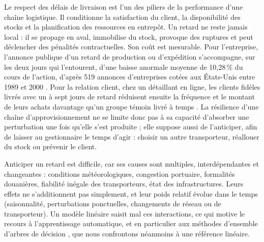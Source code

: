 \documentclass[11pt,a4paper]{article}
\theoremstyle{definition}
\begin{document}
Le respect des délais de livraison est l'un des piliers de la performance d'une chaîne logistique. Il conditionne la satisfaction du client, la disponibilité des stocks et la planification des ressources en entrepôt. Un retard ne reste jamais local : il se propage en aval, immobilise du stock, provoque des ruptures et peut déclencher des pénalités contractuelles. Son coût est mesurable. Pour l'entreprise, l'annonce publique d'un retard de production ou d'expédition s'accompagne, sur les deux jours qui l'entourent, d'une baisse anormale moyenne de 10,28\,\% du cours de l'action, d'après 519 annonces d'entreprises cotées aux États-Unis entre 1989 et 2000 \cite{hendricks2003effect}. Pour la relation client, chez un détaillant en ligne, les clients fidèles livrés avec un à sept jours de retard réduisent ensuite la fréquence et le montant de leurs achats davantage qu'un groupe témoin livré à temps \cite{rao2011failure}. La résilience d'une chaîne d'approvisionnement ne se limite donc pas à sa capacité d'absorber une perturbation une fois qu'elle s'est produite ; elle suppose aussi de l'anticiper, afin de laisser au gestionnaire le temps d'agir : choisir un autre transporteur, réallouer du stock ou prévenir le client.

Anticiper un retard est difficile, car ses causes sont multiples, interdépendantes et changeantes : conditions météorologiques, congestion portuaire, formalités douanières, fiabilité inégale des transporteurs, état des infrastructures. Leurs effets ne s'additionnent pas simplement, et leur poids relatif évolue dans le temps (saisonnalité, perturbations ponctuelles, changements de réseau ou de transporteur). Un modèle linéaire saisit mal ces interactions, ce qui motive le recours à l'apprentissage automatique, et en particulier aux méthodes d'ensemble d'arbres de décision \cite{breiman2001random,friedman2001greedy,chen2016xgboost}, que nous confrontons néanmoins à une référence linéaire.
\end{document}
